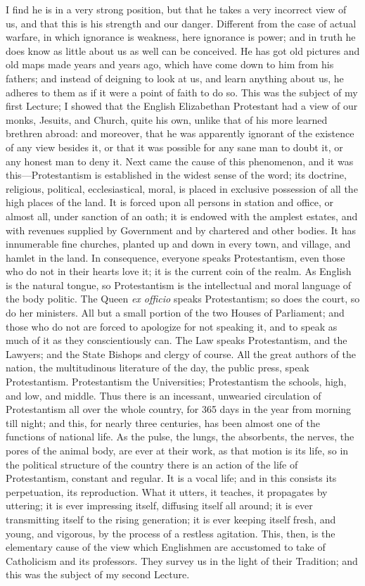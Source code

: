 I find he is in a very strong position, but that he
takes a very incorrect view of us, and that this is his
strength and our danger. Different from the case of
actual warfare, in which ignorance is weakness, here
ignorance is power; and in truth he does know as little
about us as well can be conceived. He has got old
pictures and old maps made years and years ago, which
have come down to him from his fathers; and instead of
deigning to look at us, and learn anything about us, he
adheres to them as if it were a point of faith to do so.
This was the subject of my first Lecture; I showed that
the English Elizabethan Protestant had a view of our
monks, Jesuits, and Church, quite his own, unlike that of
his more learned brethren abroad: and moreover, that he
was apparently ignorant of the existence of any view
besides it, or that it was possible for any sane man to
doubt it, or any honest man to deny it. Next came the
cause of this phenomenon, and it was
this—Protestantism is established in the widest
sense of the word; its doctrine, religious, political,
ecclesiastical, moral, is placed in exclusive possession
of all the high places of the land. It is forced upon all
persons in station and office, or almost all, under
sanction of an oath; it is endowed with the amplest
estates, and with revenues supplied by Government and by
chartered and other bodies. It has innumerable fine
churches, planted up and down in every town, and village,
and hamlet in the land. In consequence, everyone speaks
Protestantism, even those who do not in their hearts love
it; it is the current coin of the realm. As English is
the natural tongue, so Protestantism is the intellectual
and moral language of the body politic. The Queen \emph{ex
officio} speaks Protestantism; so does the court, so
do her ministers. All but a small portion of the two
Houses of Parliament; and those who do not are forced to
apologize for not speaking it, and to speak as much of it
as they conscientiously can. The Law speaks
Protestantism, and the Lawyers; and the State Bishops and
clergy of course. All the great authors of the nation,
the multitudinous literature of the day, the public
press, speak Protestantism. Protestantism the
Universities; Protestantism the schools, high, and low,
and middle. Thus there is an incessant, unwearied
circulation of Protestantism all over the whole country,
for 365 days in the year from morning till night; and
this, for nearly three centuries, has been almost one of
the functions of national life. As the pulse, the lungs,
the absorbents, the nerves, the pores of the animal body,
are ever at their work, as that motion is its life, so in
the political structure of the country there is an action
of the life of Protestantism, constant and regular. It is
a vocal life; and in this consists its perpetuation, its
reproduction. What it utters, it teaches, it propagates by uttering; it is ever impressing itself, diffusing
itself all around; it is ever transmitting itself to the
rising generation; it is ever keeping itself fresh, and
young, and vigorous, by the process of a restless
agitation. This, then, is the elementary cause of the
view which Englishmen are accustomed to take of
Catholicism and its professors. They survey us in the
light of their Tradition; and this was the subject of my
second Lecture.

